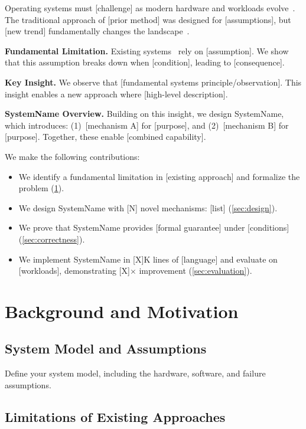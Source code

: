 \documentclass[sigplan,10pt]{acmart}
\newcommand{\system}{SystemName\xspace}
\newcommand{\para}[1]{\smallskip\noindent\textbf{#1.}}
\begin{document}
Operating systems must [challenge] as modern hardware and workloads
evolve~\cite{ghemawat2003gfs}. The traditional approach of [prior method]
was designed for [assumptions], but [new trend] fundamentally changes
the landscape~\cite{corbett2013spanner}.

\para{Fundamental Limitation}
Existing systems~\cite{decandia2007dynamo, hunt2010zookeeper}
rely on [assumption]. We show that this assumption breaks down
when [condition], leading to [consequence].

\para{Key Insight}
We observe that [fundamental systems principle/observation]. This
insight enables a new approach where [high-level description].

\para{\system Overview}
Building on this insight, we design \system, which introduces:
(1)~[mechanism A] for [purpose], and (2)~[mechanism B] for [purpose].
Together, these enable [combined capability].

We make the following contributions:
\begin{itemize}
  \item We identify a fundamental limitation in [existing approach]
        and formalize the problem (\cref{sec:background}).
  \item We design \system with [N] novel mechanisms: [list]
        (\cref{sec:design}).
  \item We prove that \system provides [formal guarantee] under
        [conditions] (\cref{sec:correctness}).
  \item We implement \system in [X]K lines of [language] and evaluate
        on [workloads], demonstrating [X]$\times$ improvement
        (\cref{sec:evaluation}).
\end{itemize}

\section{Background and Motivation}
\label{sec:background}

\subsection{System Model and Assumptions}

Define your system model, including the hardware, software, and
failure assumptions.

\subsection{Limitations of Existing Approaches}
\end{document}
